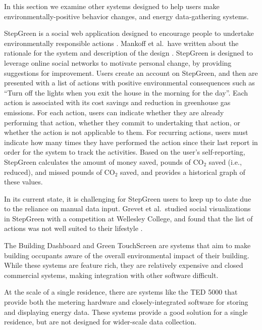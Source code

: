 In this section we examine other systems designed to help users make environmentally-positive behavior changes, and energy data-gathering systems.

StepGreen is a social web application designed to encourage people to undertake environmentally responsible actions \cite{step-green-website}. Mankoff et al.\ have written about the rationale for the system and description of the design  \cite{Mankoff2007Leveraging-Soci}. StepGreen is designed to leverage online social networks to motivate personal change, by providing suggestions for improvement. Users create an account on StepGreen, and then are presented with a list of actions with positive environmental consequences such as ``Turn off the lights when you exit the house in the morning for the day''. Each action is associated with its cost savings and reduction in greenhouse gas emissions. For each action, users can indicate whether they are already performing that action, whether they commit to undertaking that action, or whether the action is not applicable to them. For recurring actions, users must indicate how many times they have performed the action since their last report in order for the system to track the activities. Based on the user's self-reporting, StepGreen calculates the amount of money saved, pounds of CO$_2$ saved (i.e., reduced), and missed pounds of CO$_2$ saved, and provides a historical graph of these values.

In its current state, it is challenging for StepGreen users to keep up to date due to the reliance on manual data input. Grevet et al.\ studied social visualizations in StepGreen with a competition at Wellesley College, and found that the list of actions was not well suited to their lifestyle \cite{Grevet10}.

The Building Dashboard \cite{building-dashboard} and Green TouchScreen \cite{greentouchscreen} are systems that aim to make building occupants aware of the overall environmental impact of their building. While these systems are feature rich, they are relatively expensive and closed commercial systems, making integration with other software difficult.

At the scale of a single residence, there are systems like the TED 5000 \cite{the-energy-detective} that provide both the metering hardware and closely-integrated software for storing and displaying energy data. These systems provide a good solution for a single residence, but are not designed for wider-scale data collection.


